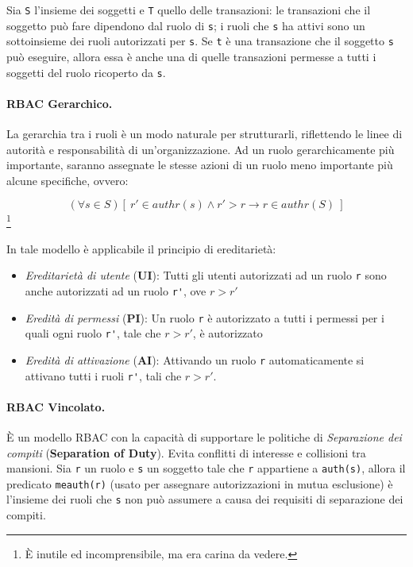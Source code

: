 Sia \verb|S| l'insieme dei soggetti e \verb|T| quello delle transazioni:
le transazioni che il soggetto può fare
dipendono dal ruolo di \verb|s|; i ruoli che \verb|s| ha attivi sono un
sottoinsieme dei ruoli autorizzati per \verb|s|.
Se \verb|t| è una transazione che il soggetto \verb|s| può eseguire, allora essa
è anche una di quelle transazioni permesse a tutti i soggetti del ruolo
ricoperto da \verb|s|.

\paragraph{RBAC Gerarchico.}
La gerarchia tra i ruoli è un modo naturale per strutturarli, riflettendo le
linee di autorità e responsabilità di un'organizzazione. Ad un ruolo
gerarchicamente più importante, saranno assegnate le stesse azioni di un ruolo
meno importante più alcune specifiche, ovvero:

\[
    (\forall s \in S)[ \ r' \in authr(s) \wedge r' > r \rightarrow r \in authr(S) \ ]
\]\footnote{È inutile ed incomprensibile, ma era carina da vedere.}

In tale modello è applicabile il principio di ereditarietà:

\begin{itemize}
    \item \textit{Ereditarietà di utente} (\textbf{UI}): Tutti gli utenti
          autorizzati ad un ruolo \verb|r| sono anche autorizzati ad
          un ruolo \verb|r'|, ove \(r > r'\)
    \item \textit{Eredità di permessi} (\textbf{PI}): Un ruolo \verb|r| è
          autorizzato a tutti i permessi per i quali ogni ruolo \verb|r'|,
          tale che \(r > r'\), è autorizzato
    \item \textit{Eredità di attivazione} (\textbf{AI}): Attivando un
          ruolo \verb|r| automaticamente si attivano tutti i ruoli \verb|r'|,
          tali che \(r > r'\).
\end{itemize}

\paragraph{RBAC Vincolato.}
È un modello RBAC con la capacità di supportare le politiche di
\textit{Separazione dei compiti}
(\textbf{Separation of Duty}). Evita conflitti di interesse e collisioni tra
mansioni.
Sia \verb|r| un ruolo e \verb|s| un soggetto tale che \verb|r|
appartiene a \verb|auth(s)|, allora il predicato
\verb|meauth(r)| (usato per assegnare autorizzazioni in mutua esclusione) è
l'insieme dei ruoli che \verb|s| non può assumere a
causa dei requisiti di separazione dei
compiti.

